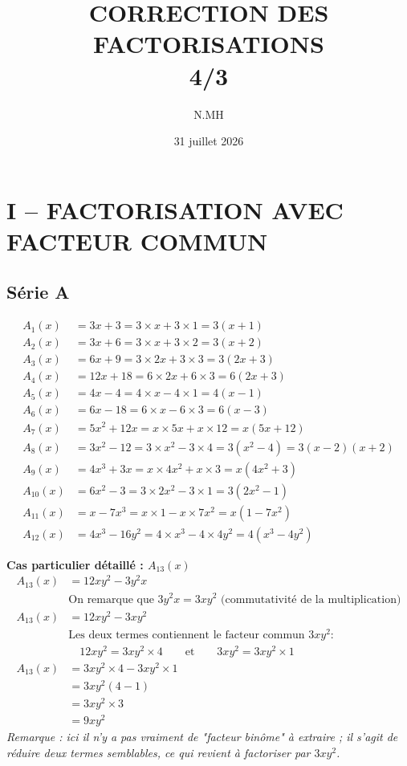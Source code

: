 \documentclass[11pt]{article}
\title{\textbf{CORRECTION DES FACTORISATIONS} \\ 4\ieme/3\ieme}
\author{N.MH}
\date{31 juillet 2026}
\begin{document}
	\maketitle
	
	\section*{I -- FACTORISATION AVEC FACTEUR COMMUN}
	
	\subsection*{Série A}
	
	\[
	\begin{aligned}
		A_1(x) &= 3x+3 = 3\times x + 3\times 1 = 3(x+1)\\[4pt]
		A_2(x) &= 3x+6 = 3\times x + 3\times 2 = 3(x+2)\\[4pt]
		A_3(x) &= 6x+9 = 3\times 2x + 3\times 3 = 3(2x+3)\\[4pt]
		A_4(x) &= 12x+18 = 6\times 2x + 6\times 3 = 6(2x+3)\\[4pt]
		A_5(x) &= 4x-4 = 4\times x - 4\times 1 = 4(x-1)\\[4pt]
		A_6(x) &= 6x-18 = 6\times x - 6\times 3 = 6(x-3)\\[4pt]
		A_7(x) &= 5x^2+12x = x\times 5x + x\times 12 = x(5x+12)\\[4pt]
		A_8(x) &= 3x^2-12 = 3\times x^2 - 3\times 4 = 3(x^2-4) = 3(x-2)(x+2)\\[4pt]
		A_9(x) &= 4x^3+3x = x\times 4x^2 + x\times 3 = x(4x^2+3)\\[4pt]
		A_{10}(x) &= 6x^2-3 = 3\times 2x^2 - 3\times 1 = 3(2x^2-1)\\[4pt]
		A_{11}(x) &= x-7x^3 = x\times 1 - x\times 7x^2 = x(1-7x^2)\\[4pt]
		A_{12}(x) &= 4x^3-16y^2 = 4\times x^3 - 4\times 4y^2 = 4(x^3-4y^2)
	\end{aligned}
	\]
	
	\medskip
	\textbf{Cas particulier détaillé : $A_{13}(x)$}
	\[
	\begin{aligned}
		A_{13}(x) &= 12xy^2 - 3y^2x\\
		&\text{On remarque que } 3y^2x = 3xy^2 \text{ (commutativité de la multiplication)}\\
		A_{13}(x) &= 12xy^2 - 3xy^2\\
		&\text{Les deux termes contiennent le facteur commun } 3xy^2 :\\
		&\quad 12xy^2 = 3xy^2 \times 4 \qquad \text{et} \qquad 3xy^2 = 3xy^2 \times 1\\
		A_{13}(x) &= 3xy^2 \times 4 - 3xy^2 \times 1\\
		&= 3xy^2(4-1)\\
		&= 3xy^2 \times 3\\
		&= 9xy^2
	\end{aligned}
	\]
	\emph{Remarque : ici il n'y a pas vraiment de "facteur binôme" à extraire ; il s'agit de réduire deux termes semblables, ce qui revient à factoriser par $3xy^2$.}
	
\end{document}
